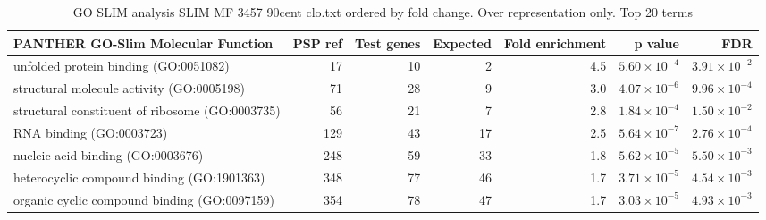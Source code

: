 \begin{table}[ht]
\centering
\begin{adjustbox}{width=\textwidth}
\begin{tabular}{lrrrrrr}
  \hline
PANTHER GO-Slim Molecular Function & PSP ref & Test genes & Expected & Fold enrichment & p value & FDR \\ 
  \hline
unfolded protein binding (GO:0051082) & 17 & 10 & 2 & 4.5 & $5.60 \times 10^{-4}$ & $3.91 \times 10^{-2}$ \\ 
  structural molecule activity (GO:0005198) & 71 & 28 & 9 & 3.0 & $4.07 \times 10^{-6}$ & $9.96 \times 10^{-4}$ \\ 
  structural constituent of ribosome (GO:0003735) & 56 & 21 & 7 & 2.8 & $1.84 \times 10^{-4}$ & $1.50 \times 10^{-2}$ \\ 
  RNA binding (GO:0003723) & 129 & 43 & 17 & 2.5 & $5.64 \times 10^{-7}$ & $2.76 \times 10^{-4}$ \\ 
  nucleic acid binding (GO:0003676) & 248 & 59 & 33 & 1.8 & $5.62 \times 10^{-5}$ & $5.50 \times 10^{-3}$ \\ 
  heterocyclic compound binding (GO:1901363) & 348 & 77 & 46 & 1.7 & $3.71 \times 10^{-5}$ & $4.54 \times 10^{-3}$ \\ 
  organic cyclic compound binding (GO:0097159) & 354 & 78 & 47 & 1.7 & $3.03 \times 10^{-5}$ & $4.93 \times 10^{-3}$ \\ 
   \hline
\end{tabular}
\end{adjustbox}
\caption{GO SLIM analysis SLIM MF 3457 90cent clo.txt ordered by fold change. Over representation only. Top 20 terms} 
\label{tab:GO SLIM analysis SLIM MF 3457 90cent clo.txt ordered by fold change. Over representation only. Top 20 terms}
\end{table}

